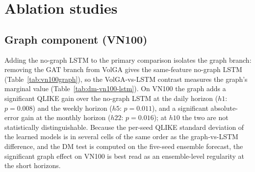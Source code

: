 \documentclass[runningheads]{llncs}
\begin{document}
\FloatBarrier
\section{Ablation studies}\label{sec:abl}
\subsection{Graph component (VN100)}\label{sec:graph}
Adding the no-graph LSTM to the primary comparison isolates the graph branch: removing the GAT branch
from VolGA gives the same-feature no-graph LSTM (Table~\ref{tab:vn100graph}), so the VolGA-vs-LSTM
contrast measures the graph's marginal value (Table~\ref{tab:dm-vn100-lstm}). On VN100 the graph adds
a significant QLIKE gain over the no-graph LSTM at the daily horizon ($h1$: $p=0.008$) and the weekly
horizon ($h5$: $p=0.011$), and a significant absolute-error gain at the monthly horizon
($h22$: $p=0.016$); at $h10$ the two are not statistically distinguishable. Because the per-seed QLIKE
standard deviation of the learned models is in several cells of the same order as the graph-vs-LSTM
difference, and the DM test is computed on the five-seed ensemble forecast, the significant graph
effect on VN100 is best read as an ensemble-level regularity at the short horizons.
\end{document}
